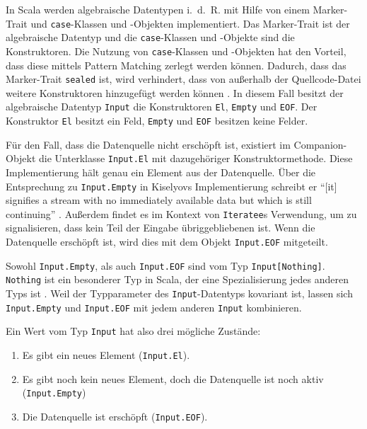 In Scala werden algebraische Datentypen i.~d.~R. mit Hilfe von einem Marker-Trait und \lstinline|case|-Klassen und -Objekten implementiert.
Das Marker-Trait ist der algebraische Datentyp und die \lstinline|case|-Klassen und -Objekte sind die Konstruktoren.
Die Nutzung von \lstinline|case|-Klassen und -Objekten hat den Vorteil, dass diese mittels Pattern Matching zerlegt werden können.
Dadurch, dass das Marker-Trait \lstinline|sealed| ist, wird verhindert, dass von außerhalb der Quellcode-Datei weitere Konstruktoren hinzugefügt werden können \cite[vgl.][]{algebraic_data_type_scala}.
In diesem Fall besitzt der algebraische Datentyp \lstinline|Input| die Konstruktoren \lstinline|El|, \lstinline|Empty| und \lstinline|EOF|.
Der Konstruktor \lstinline|El| besitzt ein Feld, \lstinline|Empty| und \lstinline|EOF| besitzen keine Felder.

Für den Fall, dass die Datenquelle nicht erschöpft ist, existiert im Companion-Objekt die Unterklasse \lstinline|Input.El| mit dazugehöriger Konstruktormethode.
Diese Implementierung hält genau ein Element aus der Datenquelle.
Über die Entsprechung zu \lstinline|Input.Empty| in Kiselyovs Implementierung schreibt er "`[it] signifies a stream with no immediately available data but which is still continuing"' \cite[vgl.][]{iteratee_io}.
Außerdem findet es im Kontext von \lstinline|Iteratee|s Verwendung, um zu signalisieren, dass kein Teil der Eingabe übriggebliebenen ist.
Wenn die Datenquelle erschöpft ist, wird dies mit dem Objekt \lstinline|Input.EOF| mitgeteilt.

Sowohl \lstinline|Input.Empty|, als auch \lstinline|Input.EOF| sind vom Typ \lstinline|Input[Nothing]|.
\lstinline|Nothing| ist ein besonderer Typ in Scala, der eine Spezialisierung jedes anderen Typs ist \cite[vgl.][S.~32]{scala_specification}.
Weil der Typparameter des \lstinline|Input|-Datentyps kovariant ist, lassen sich \lstinline|Input.Empty| und \lstinline|Input.EOF| mit jedem anderen \lstinline|Input| kombinieren.

Ein Wert vom Typ \lstinline|Input| hat also drei mögliche Zustände:
\begin{enumerate}
  \item Es gibt ein neues Element (\lstinline|Input.El|).
  \item Es gibt noch kein neues Element, doch die Datenquelle ist noch aktiv (\lstinline|Input.Empty|)
  \item Die Datenquelle ist erschöpft (\lstinline|Input.EOF|).
\end{enumerate}

